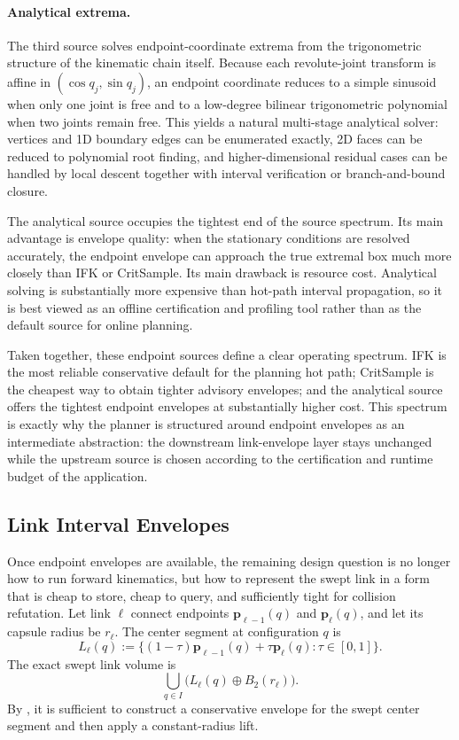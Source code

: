 \documentclass[journal]{IEEEtran}
\begin{document}
\paragraph{Analytical extrema.}
The third source solves endpoint-coordinate extrema from the trigonometric
structure of the kinematic chain itself. Because each revolute-joint transform
is affine in $(\cos q_j,\sin q_j)$, an endpoint coordinate reduces to a simple
sinusoid when only one joint is free and to a low-degree bilinear
trigonometric polynomial when two joints remain free. This yields a natural
multi-stage analytical solver: vertices and 1D boundary edges can be enumerated
exactly, 2D faces can be reduced to polynomial root finding, and
higher-dimensional residual cases can be handled by local descent together with
interval verification or branch-and-bound closure.

The analytical source occupies the tightest end of the source spectrum. Its
main advantage is envelope quality: when the stationary conditions are resolved
accurately, the endpoint envelope can approach the true extremal box much more
closely than IFK or CritSample. Its main drawback is resource cost. Analytical
solving is substantially more expensive than hot-path interval propagation, so
it is best viewed as an offline certification and profiling tool rather than as
the default source for online planning.

Taken together, these endpoint sources define a clear operating spectrum. IFK
is the most reliable conservative default for the planning hot path; CritSample is
the cheapest way to obtain tighter advisory envelopes; and the analytical
source offers the tightest endpoint envelopes at substantially higher cost.
This spectrum is exactly why the planner is
structured around endpoint envelopes as an intermediate abstraction: the
downstream link-envelope layer stays unchanged while the upstream source is
chosen according to the certification and runtime budget of the application.

\subsection{Link Interval Envelopes}\label{sec:rewrite_link_env}

Once endpoint envelopes are available, the remaining design question is no
longer how to run forward kinematics, but how to represent the swept link in a
form that is cheap to store, cheap to query, and sufficiently tight for
collision refutation. Let link $\ell$ connect endpoints
$\bm{p}_{\ell-1}(q)$ and $\bm{p}_{\ell}(q)$, and let its capsule radius be
$r_\ell$. The center segment at configuration $q$ is
\[
L_\ell(q) := \{(1-\tau)\bm{p}_{\ell-1}(q) + \tau \bm{p}_{\ell}(q) :
\tau \in [0,1]\}.
\]
The exact swept link volume is
\[
\bigcup_{q\in I} \bigl(L_\ell(q) \oplus B_2(r_\ell)\bigr).
\]
By , it is sufficient to construct a conservative
envelope for the swept center segment and then apply a constant-radius lift.
\end{document}
